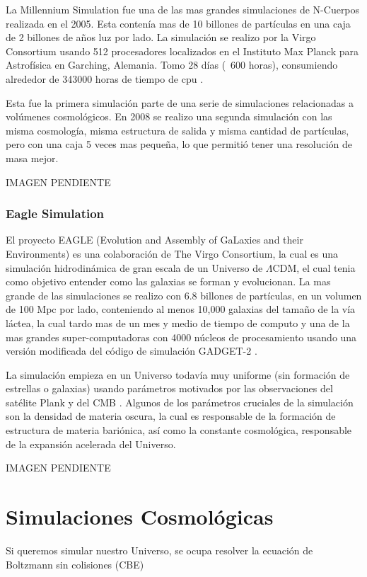 La Millennium Simulation fue una de las mas grandes simulaciones de N-Cuerpos realizada en el 2005. Esta contenía mas de 10 billones de partículas en una caja de 2 billones de años luz por lado. La simulación se realizo por la Virgo Consortium usando 512 procesadores localizados en el Instituto Max Planck para Astrofísica en Garching, Alemania. Tomo 28 días (~600 horas), consumiendo alrededor  de  343000 horas de tiempo de cpu \cite{2005Natur.435..629S}.

Esta fue la primera simulación parte de una serie de simulaciones relacionadas a volúmenes cosmológicos. En 2008 se realizo una segunda simulación con las misma cosmología, misma estructura de salida y misma cantidad de partículas, pero con una caja 5 veces mas pequeña, lo que permitió tener una resolución de masa mejor.

{\LARGE
IMAGEN PENDIENTE
}


\subsubsection{Eagle Simulation}
El proyecto EAGLE (Evolution and Assembly of GaLaxies and their Environments)  es una colaboración de The Virgo Consortium, la cual es una simulación hidrodinámica de gran escala de un Universo de $\Lambda$CDM, el cual tenia como objetivo entender como las galaxias se forman y evolucionan. La mas grande de las simulaciones se realizo con  6.8 billones de partículas, en un volumen de 100 Mpc por lado, conteniendo al menos 10,000 galaxias del tamaño de la vía láctea, la cual tardo mas de un mes y medio de tiempo de computo y una de la mas grandes super-computadoras con 4000 núcleos de procesamiento usando una versión modificada del código de simulación GADGET-2 \cite{2015MNRAS.450.1937C, 2015MNRAS.446..521S}.

La simulación empieza en un Universo todavía muy uniforme (sin formación de estrellas o galaxias) usando parámetros motivados por las observaciones del satélite Plank y del CMB \cite{ 2013ApJS..208...20B, 2020A&A...641A...1P}. Algunos de los parámetros cruciales de la simulación son la densidad de materia oscura, la cual es responsable de la formación de estructura de materia bariónica, así como la constante cosmológica, responsable de la expansión acelerada del Universo.

{\LARGE
IMAGEN PENDIENTE
}
\section{Simulaciones Cosmológicas}
Si queremos simular nuestro Universo, se ocupa resolver la ecuación de Boltzmann sin colisiones (CBE)

